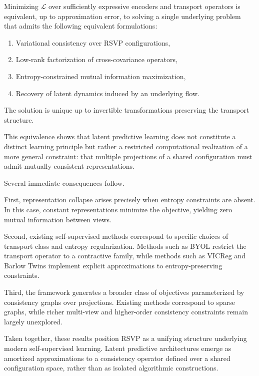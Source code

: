 \documentclass[12pt, oneside]{article}
\begin{document}
\begin{theorem}
Minimizing $\mathcal{L}$ over sufficiently expressive encoders and transport operators is equivalent, up to approximation error, to solving a single underlying problem that admits the following equivalent formulations:
\begin{enumerate}
\item Variational consistency over RSVP configurations,
\item Low-rank factorization of cross-covariance operators,
\item Entropy-constrained mutual information maximization,
\item Recovery of latent dynamics induced by an underlying flow.
\end{enumerate}
The solution is unique up to invertible transformations preserving the transport structure.
\end{theorem}

This equivalence shows that latent predictive learning does not constitute a distinct learning principle but rather a restricted computational realization of a more general constraint: that multiple projections of a shared configuration must admit mutually consistent representations.

Several immediate consequences follow.

First, representation collapse arises precisely when entropy constraints are absent. In this case, constant representations minimize the objective, yielding zero mutual information between views.

Second, existing self-supervised methods correspond to specific choices of transport class and entropy regularization. Methods such as BYOL restrict the transport operator to a contractive family, while methods such as VICReg and Barlow Twins implement explicit approximations to entropy-preserving constraints.

Third, the framework generates a broader class of objectives parameterized by consistency graphs over projections. Existing methods correspond to sparse graphs, while richer multi-view and higher-order consistency constraints remain largely unexplored.

Taken together, these results position RSVP as a unifying structure underlying modern self-supervised learning. Latent predictive architectures emerge as amortized approximations to a consistency operator defined over a shared configuration space, rather than as isolated algorithmic constructions.
\end{document}
